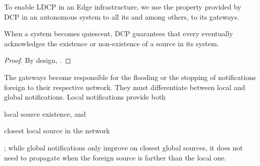 \begin{definition}
\end{definition}

To enable LDCP in an Edge infrastructure, we use the property provided
by DCP in an autonomous system to all its \processes and among others,
to its gateways.

\begin{lemma}
  When a system becomes quiescent, DCP guarantees that every \process
  eventually acknowledges the existence or non-existence of a source
  in its system.
\end{lemma}

\begin{proof}
  By design, .
\end{proof}

The gateways become responsible for the flooding or the stopping of
notifications foreign to their respective network. They must
differentiate between local and global notifications. Local
notifications provide both \begin{inparaenum}[(i)]
\item local source existence, and
\item closest local source in the network
\end{inparaenum}; while global notifications only improve on closest global sources,
\ie it does not need to propagate when the foreign source is farther
than the local one.

\begin{definition}
\end{definition} 




